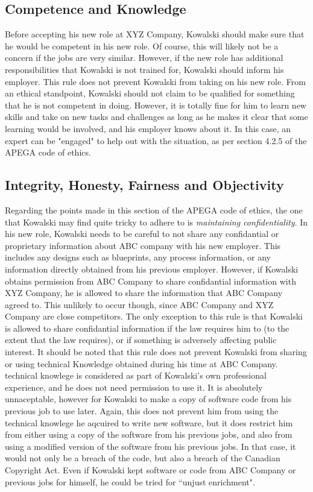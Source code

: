 \documentclass[letterpaper,12pt]{article}
\begin{document}
\subsection{Competence and Knowledge}
Before accepting his new role at XYZ Company, Kowalski should make sure that he would be competent in his new role.
Of course, this will likely not be a concern if the jobs are very similar. However, if the new role has additional responsibilities that Kowalski
is not trained for, Kowalski should inform his employer. This rule does not prevent Kowalski from taking on his new role. From an ethical standpoint,
Kowalski should not claim to be qualified for something that he is not competent in doing. However, it is totally fine for him to learn new skills and take on
new tasks and challenges as long as he makes it clear that some learning would be involved, and his employer knows about it. In this case, an expert can be "engaged"
to help out with the situation, as per section 4.2.5 of the APEGA code of ethics.\cite{apegacode}

\subsection{Integrity, Honesty, Fairness and Objectivity}
Regarding the points made in this section of the APEGA code of ethics, the one that Kowalski may find quite tricky to
adhere to is \textit{maintaining confidentiality}. In his new role, Kowalski needs to be careful to not share
any confidantial or proprietary information about ABC company with his new employer. This includes any designs such as blueprints,
any process information, or any information directly obtained from his previous employer. However, if Kowalski obtains permission from ABC Company to share
confidantial information with XYZ Company, he is allowed to share the information that ABC Company agreed to. This unlikely to occur though,
since ABC Company and XYZ Company are close competitors. The only exception to this rule is that Kowalski is allowed to share confidantial information 
if the law requires him to (to the extent that the law requires), or if something is adversely affecting public interest. It should be noted that this
rule does not prevent Kowalski from sharing or using technical Knowledge obtained during his time at ABC Company. technical knowlege is considered as part of
Kowalski's own professional experience, and he does not need permission to use it. It is absolutely unnaceptable, however for Kowalski to make a copy of
software code from his previous job to use later. Again, this does not prevent him from using the technical knowlege he aqcuired to write new software, 
but it does restrict him from either using a copy of the software from his previous jobs, and also from using a modified version of the software
from his previous jobs. In that case, it would not only be a breach of the code, but also a breach of the Canadian Copyright Act\cite{copyrightact}.
Even if Kowalski kept software or code from ABC Company or previous jobs for himself, he could be tried for ``unjust enrichment".\cite{apegacode}
\end{document}
